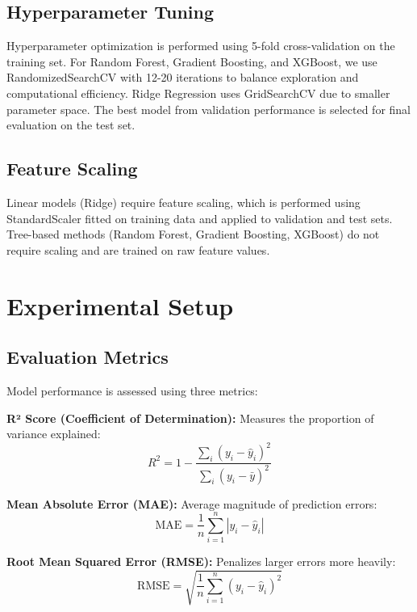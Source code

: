 \documentclass[conference]{IEEEtran}
\begin{document}
\subsection{Hyperparameter Tuning}

Hyperparameter optimization is performed using 5-fold cross-validation on the training set. For Random Forest, Gradient Boosting, and XGBoost, we use RandomizedSearchCV with 12-20 iterations to balance exploration and computational efficiency. Ridge Regression uses GridSearchCV due to smaller parameter space. The best model from validation performance is selected for final evaluation on the test set.

\subsection{Feature Scaling}

Linear models (Ridge) require feature scaling, which is performed using StandardScaler fitted on training data and applied to validation and test sets. Tree-based methods (Random Forest, Gradient Boosting, XGBoost) do not require scaling and are trained on raw feature values.

\section{Experimental Setup}

\subsection{Evaluation Metrics}

Model performance is assessed using three metrics:

\textbf{R² Score (Coefficient of Determination):} Measures the proportion of variance explained:
\begin{equation}
R^2 = 1 - \frac{\sum_{i}(y_i - \hat{y}_i)^2}{\sum_{i}(y_i - \bar{y})^2}
\end{equation}

\textbf{Mean Absolute Error (MAE):} Average magnitude of prediction errors:
\begin{equation}
\text{MAE} = \frac{1}{n}\sum_{i=1}^{n}|y_i - \hat{y}_i|
\end{equation}

\textbf{Root Mean Squared Error (RMSE):} Penalizes larger errors more heavily:
\begin{equation}
\text{RMSE} = \sqrt{\frac{1}{n}\sum_{i=1}^{n}(y_i - \hat{y}_i)^2}
\end{equation}
\end{document}
